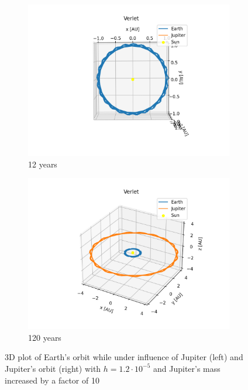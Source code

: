     \begin{figure}[h!]
		\centering
		\begin{subfigure}{0.48\linewidth}
			\includegraphics[width=1.2\linewidth]{Figure/threebody10mass12.png}
			\caption{12 years}
		\end{subfigure}
		\begin{subfigure}{0.48\linewidth}
			\includegraphics[width=1.15\linewidth]{Figure/threebody10120.png}
			\caption{120 years}
		\end{subfigure}
		\caption{3D plot of Earth's orbit while under influence of Jupiter (left) and Jupiter's orbit (right) with $h = 1.2\cdot10^{-5}$ and Jupiter's mass increased by a factor of 10}
		\label{jupitermass10}
	\end{figure}
	

